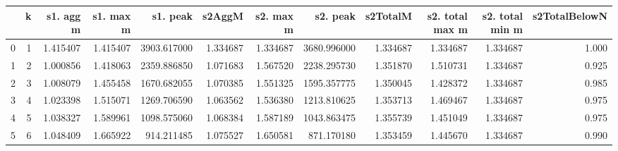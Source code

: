 \begin{tabular}{lrrrrrrrrrrr}
\toprule
{} &  k &  s1. agg m &  s1. max m &     s1. peak &    s2AggM &  s2. max m &     s2. peak &  s2TotalM &  s2. total max m &  s2. total min m &  s2TotalBelowN \\
\midrule
0 &  1 &   1.415407 &   1.415407 &  3903.617000 &  1.334687 &   1.334687 &  3680.996000 &  1.334687 &         1.334687 &         1.334687 &          1.000 \\
1 &  2 &   1.000856 &   1.418063 &  2359.886850 &  1.071683 &   1.567520 &  2238.295730 &  1.351870 &         1.510731 &         1.334687 &          0.925 \\
2 &  3 &   1.008079 &   1.455458 &  1670.682055 &  1.070385 &   1.551325 &  1595.357775 &  1.350045 &         1.428372 &         1.334687 &          0.985 \\
3 &  4 &   1.023398 &   1.515071 &  1269.706590 &  1.063562 &   1.536380 &  1213.810625 &  1.353713 &         1.469467 &         1.334687 &          0.975 \\
4 &  5 &   1.038327 &   1.589961 &  1098.575060 &  1.068384 &   1.587189 &  1043.863475 &  1.355739 &         1.451049 &         1.334687 &          0.975 \\
5 &  6 &   1.048409 &   1.665922 &   914.211485 &  1.075527 &   1.650581 &   871.170180 &  1.353459 &         1.445670 &         1.334687 &          0.990 \\
\bottomrule
\end{tabular}
